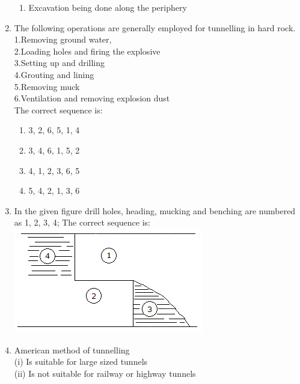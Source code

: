 \documentclass[11pt,a4paper]{article}
\begin{document}
\begin{enumerate}
\begin{enumerate}[label=\Alph*.]
\item{Excavation being done along the periphery}
\end{enumerate}
\item{The following operations are generally employed for tunnelling in hard rock.  \\
1.Removing ground water,  \\
2.Loading holes and firing the explosive  \\
3.Setting up and drilling  \\
4.Grouting and lining  \\
5.Removing muck  \\
6.Ventilation and removing explosion dust  \\
The correct sequence is:}
\begin{enumerate}[label=\Alph*.]
\item{3, 2, 6, 5, 1, 4}
\item{3, 4, 6, 1, 5, 2}
\item{4, 1, 2, 3, 6, 5}
\item{5, 4, 2, 1, 3, 6}
\end{enumerate}
\item{In the given figure drill holes, heading, mucking and benching are numbered as 1, 2, 3, 4; The correct sequence is: \\
 \includegraphics{../data_img/tunnel-engineering_1525415833-32.png}
}
\\
\item{American method of tunnelling \\
 (i) Is suitable for large sized tunnels \\
 (ii) Is not suitable for railway or highway tunnels \\
}
\end{enumerate}
\end{document}
